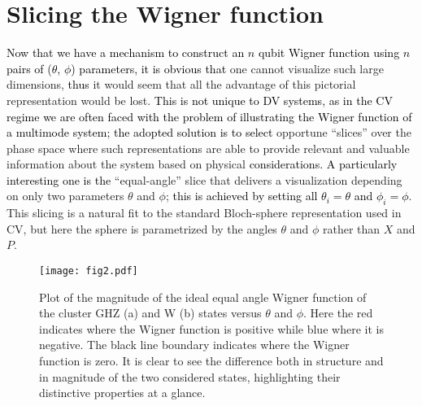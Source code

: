 \documentclass[pra,reprint,showkeys,showpacs,times,superscriptaddress]{revtex4-1}
\newcommand{\red}{\textcolor{black}}
\begin{document}
\section{Slicing the Wigner function}

\red{Now that we have a mechanism to construct an $n$ qubit Wigner function using $n$ pairs of ($\theta$, $\phi$) parameters, it is obvious that} one cannot visualize such large dimensions, \red{thus} it would seem that all the advantage of this pictorial representation would be lost. \red{This is not unique to DV systems, as in the CV regime we are often faced with the problem of illustrating the Wigner function of a multimode system; the adopted solution is to select} opportune ``slices'' over the phase space where such representations are able to provide relevant and valuable information about the system based on physical \red{considerations. A particularly interesting one is the} ``equal-angle'' slice that delivers a visualization depending on only two parameters $\theta$ and $\phi$; \red{this is achieved by setting all $\theta_i = \theta$ and $\phi_i = \phi$}. This slicing is a natural fit to the standard Bloch-sphere representation used in CV, but here the sphere is parametrized by the angles $\theta$ and $\phi$ rather than $X$ and $P$. 
\begin{figure}[htb]
{\texttt{[image: fig2.pdf]}}
\caption{Plot of the magnitude of the ideal equal angle Wigner function of the cluster GHZ (a) and W (b) states versus $\theta$ and $\phi$. Here the red indicates where the Wigner function is positive while blue where it is negative. The black line boundary indicates where the Wigner function is zero.  It is clear to see the difference both in structure and in magnitude of the two considered states, highlighting their distinctive properties at a glance.}
\label{idealwigner}  
\end{figure}
\end{document}
